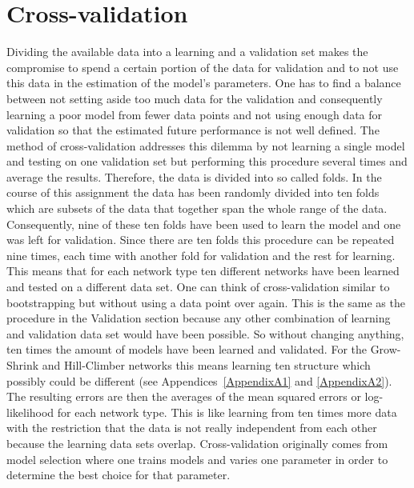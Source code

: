 \section{Cross-validation}
Dividing the available data into a learning and a validation set makes the compromise to spend a certain portion of the data for validation and to not use this data in the estimation of the model's parameters. One has to find a balance between not setting aside too much data for the validation and consequently learning a poor model from fewer data points and not using enough data for validation so that the estimated future performance is not well defined. The method of cross-validation addresses this dilemma by not learning a single model and testing on one validation set but performing this procedure several times and average the results. Therefore, the data is divided into so called folds. In the course of this assignment the data has been randomly divided into ten folds which are subsets of the data that together span the whole range of the data. Consequently, nine of these ten folds have been used to learn the model and one was left for validation. Since there are ten folds this procedure can be repeated nine times, each time with another fold for validation and the rest for learning. This means that for each network type ten different networks have been learned and tested on a different data set. One can think of cross-validation similar to bootstrapping but without using a data point over again. This is the same as the procedure in the Validation section because any other combination of learning and validation data set would have been possible. So without changing anything, ten times the amount of models have been learned and validated. For the Grow-Shrink and Hill-Climber networks this means learning ten structure which possibly could be different (see Appendices~\ref{AppendixA1} and \ref{AppendixA2}).\\
The resulting errors are then the averages of the mean squared errors or log-likelihood for each network type. This is like learning from ten times more data with the restriction that the data is not really independent from each other because the learning data sets overlap. Cross-validation originally comes from model selection where one trains models and varies one parameter in order to determine the best choice for that parameter.

